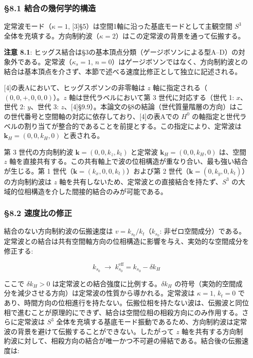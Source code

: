 \documentclass[
  a4paper,11pt]{ltjsarticle}
\theoremstyle{definition}
\theoremstyle{remark}
\begin{document}
\subsubsection{§8.1
結合の幾何学的構造}\label{ux7d50ux5408ux306eux5e7eux4f55ux5b66ux7684ux69cbux9020}

定常波モード（\(\kappa = 1\),
{[}3{]}§5）は空間1軸に沿った基底モードとして主観空間 \(S^3\)
全体を充填する。方向制約波（\(\kappa = 2\)）はこの定常波の背景を通って伝搬する。

\textbf{注意 8.1}:
ヒッグス結合は§3の基本頂点分類（ゲージボソンによる型A--D）の対象外である。定常波（\(\kappa_s = 1\),
\(n = 0\)）はゲージボソンではなく、方向制約波との結合は基本頂点を介さず、本節で述べる速度比修正として独立に記述される。

{[}4{]}の表Aにおいて、ヒッグスボソンの非零軸は \(z\)
軸に指定される（\((0, 0, +, 0, 0, 0)\)）。\(z\) 軸は世代ラベルにおいて第
3 世代に対応する（世代 1: \(x\)、世代 2: \(y\)、世代 3:
\(z\)、{[}4{]}§9.9）。本論文の§8の結論（世代質量階層の方向）はこの世代番号と空間軸の対応に依存しており、{[}4{]}の表Aでの
\(H^0\)
の軸指定と世代ラベルの割り当てが整合的であることを前提とする。この指定により、定常波は
\(\mathbf{k}_H = (0, 0, k_H, 0)\) と表される。

第 3 世代の方向制約波 \(\mathbf{k} = (0, 0, k_z, k_t)\) と定常波
\(\mathbf{k}_H = (0, 0, k_H, 0)\) は、空間 \(z\)
軸を直接共有する。この共有軸上で波の位相構造が重なり合い、最も強い結合が生じる。第
1 世代（\(\mathbf{k} = (k_x, 0, 0, k_t)\)）および第 2
世代（\(\mathbf{k} = (0, k_y, 0, k_t)\)）の方向制約波は \(z\)
軸を共有しないため、定常波との直接結合を持たず、\(S^3\)
の大域的位相構造を介した間接的結合のみが可能である。

\subsubsection{§8.2
速度比の修正}\label{ux901fux5ea6ux6bd4ux306eux4feeux6b63}

結合のない方向制約波の伝搬速度は \(v = k_{s_0} / k_t\)（\(k_{s_0}\):
非ゼロ空間成分）である。定常波との結合は共有空間軸方向の位相構造に影響を与え、実効的な空間成分を修正する:

\[k_{s_0} \;\longrightarrow\; k_{s_0}^{\text{eff}} = k_{s_0} - \delta k_H\]

ここで \(\delta k_H > 0\) は定常波との結合強度に比例する。\(\delta k_H\)
の符号（実効的空間成分を減少させる方向）は定常波の性質から導かれる。定常波は
\(\kappa = 1\), \(k_t = 0\)
であり、時間方向の位相進行を持たない。伝搬位相を持たない波は、伝搬波と同位相で進むことが原理的にできず、結合は空間位相の相殺方向にのみ作用する。さらに定常波は
\(S^3\)
全体を充填する基底モード振動であるため、方向制約波は定常波の背景を避けて伝搬することができない。したがって
\(z\)
軸を共有する方向制約波に対して、相殺方向の結合が唯一かつ不可避の帰結である。結合後の伝搬速度は:
\end{document}
